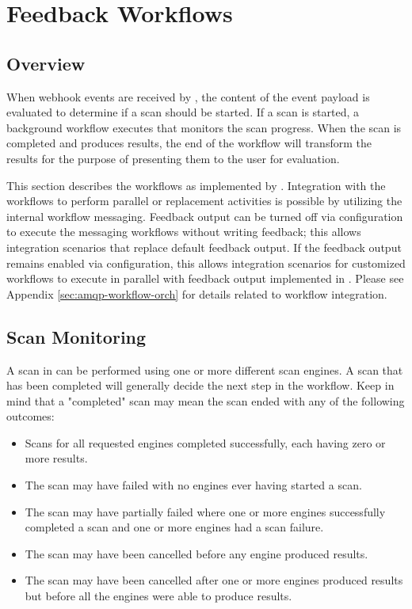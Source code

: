 \chapter{Feedback Workflows}\label{sec:feedback-workflows}


\section{Overview}

When webhook events are received by \cxoneflowns, the content of the event
payload is evaluated to determine if a scan should be started.  If a scan
is started, a background workflow executes that monitors the scan progress.
When the scan is completed and produces results, the end of the workflow
will transform the results for the purpose of presenting them to the user
for evaluation.

This section describes the workflows as implemented by \cxoneflowns.  Integration
with the workflows to perform parallel or replacement activities is possible
by utilizing the internal workflow messaging. Feedback output can be turned off 
via configuration to execute the messaging workflows without writing feedback; this
allows integration scenarios that replace default feedback output.  If the
feedback output remains enabled via configuration, this allows integration
scenarios for customized workflows to execute in parallel with feedback
output implemented in \cxoneflowns. Please see Appendix 
\ref{sec:amqp-workflow-orch} for details related to workflow integration.




\section{Scan Monitoring}

A scan in \cxone can be performed using one or more different scan engines.
A scan that has been completed will generally decide the next step in the workflow.
Keep in mind that a "completed" scan may mean the scan ended with any of the
following outcomes:

\begin{itemize}
    \item Scans for all requested engines completed successfully, each having zero
    or more results.
    \item The scan may have failed with no engines ever having started a scan.
    \item The scan may have partially failed where one or more engines successfully
    completed a scan and one or more engines had a scan failure.
    \item The scan may have been cancelled before any engine produced results.
    \item The scan may have been cancelled after one or more engines produced
    results but before all the engines were able to produce results.
\end{itemize}

